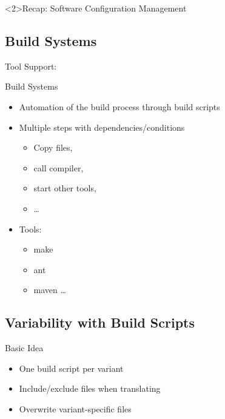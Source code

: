 
\begin{frame}<2>{Recap: Software Configuration Management}
	\frameSoftwareConfigurationManagement
\end{frame}

\subsection{Build Systems}

\begin{frame}{Tool Support: \myframetitle}
	\begin{mycolumns}[widths={40},animation=none]
		\begin{definition}{Build Systems} %
			\begin{itemize}
				\item Automation of the build process through build scripts
				\item Multiple steps with dependencies/conditions
				\begin{itemize}
					\item Copy files, 
					\item call compiler, 
					\item start other tools, 
					\item \ldots
				\end{itemize}
				\item Tools: 
				\begin{itemize}
					\item make
					\item ant
					\item maven
					\ldots
				\end{itemize}
			\end{itemize}
		\end{definition}
	\mynextcolumn
	\end{mycolumns}	
\end{frame}

\subsection{Variability with Build Scripts}

\begin{frame}{\myframetitle}
	\myframeicon{\mysource{\staplesandhill}}
	\vspace{-\textheightoftitle}
	\begin{mycolumns}
		\begin{note}{Basic Idea}
			\begin{itemize}
				\item One build script per variant
				\item Include/exclude files when translating
				\item Overwrite variant-specific files
			\end{itemize}
		\end{note}
	\mynextcolumn
		\centering{}
	\end{mycolumns}	
\end{frame}

